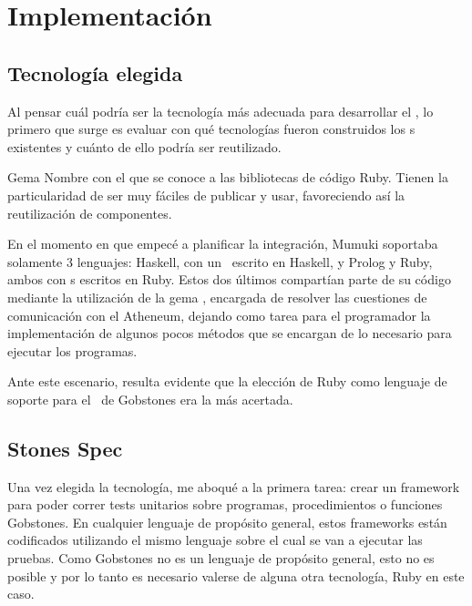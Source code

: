 
\section{Implementación}

\subsection{Tecnología elegida}
Al pensar cuál podría ser la tecnología más adecuada para desarrollar el \runner, lo primero que surge es evaluar con qué tecnologías fueron construidos los \runner s existentes y cuánto de ello podría ser reutilizado.

\sepfootnotecontent
  {Gema}
  {Nombre con el que se conoce a las bibliotecas de código Ruby. Tienen la particularidad de ser muy fáciles de publicar y usar, favoreciendo así la reutilización de componentes.}

En el momento en que empecé a planificar la integración, Mumuki soportaba solamente 3 lenguajes: Haskell, con un \runner\ escrito en Haskell, y Prolog y Ruby, ambos con \runner s escritos en Ruby. Estos dos últimos compartían parte de su código mediante la utilización de la gema \mumukit, encargada de resolver las cuestiones de comunicación con el Atheneum, dejando como tarea para el programador la implementación de algunos pocos métodos que se encargan de lo necesario para ejecutar los programas.

Ante este escenario, resulta evidente que la elección de Ruby como lenguaje de soporte para el \runner\ de Gobstones era la más acertada.

\subsection{Stones Spec}
Una vez elegida la tecnología, me aboqué a la primera tarea: crear un framework para poder correr tests unitarios sobre programas, procedimientos o funciones Gobstones. En cualquier lenguaje de propósito general, estos frameworks están codificados utilizando el mismo lenguaje sobre el cual se van a ejecutar las pruebas. Como Gobstones no es un lenguaje de propósito general, esto no es posible y por lo tanto es necesario valerse de alguna otra tecnología, Ruby en este caso.


